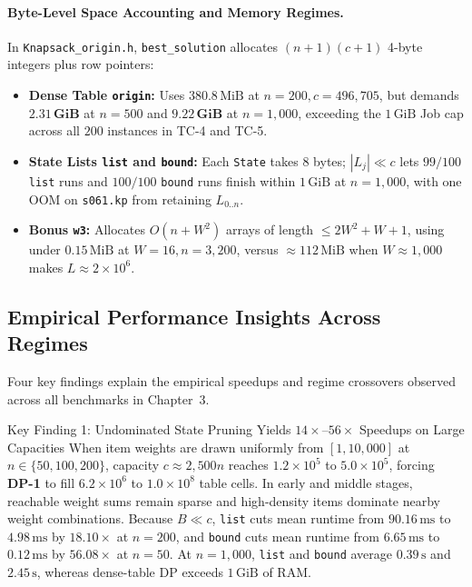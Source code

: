 \documentclass[10pt, a4paper]{article}
\newcommand{\code}[1]{\texttt{\color{primary!90!black}#1}}
\begin{document}
\paragraph{Byte-Level Space Accounting and Memory Regimes.}
In \code{Knapsack\_origin.h}, \code{best\_solution} allocates $(n+1)(c+1)$ 4-byte integers plus row pointers:
\begin{itemize}
  \item \textbf{Dense Table \code{origin}:} Uses $380.8\,\text{MiB}$ at $n = 200, c = 496{,}705$, but demands $\mathbf{2.31\,\text{GiB}}$ at $n = 500$ and $\mathbf{9.22\,\text{GiB}}$ at $n = 1{,}000$, exceeding the $1\,\text{GiB}$ Job cap across all $200$ instances in TC-4 and TC-5.
  \item \textbf{State Lists \code{list} and \code{bound}:} Each \code{State} takes $8$ bytes; $|L_j| \ll c$ lets $99/100$ \code{list} runs and $100/100$ \code{bound} runs finish within $1\,\text{GiB}$ at $n = 1{,}000$, with one OOM on \code{s061.kp} from retaining $L_{0..n}$.
  \item \textbf{Bonus \code{w3}:} Allocates $O(n + W^2)$ arrays of length $\le 2W^2 + W + 1$, using under $0.15\,\text{MiB}$ at $W = 16, n = 3{,}200$, versus $\approx 112\,\text{MiB}$ when $W \approx 1{,}000$ makes $L \approx 2\times 10^6$.
\end{itemize}

\subsection{Empirical Performance Insights Across Regimes}
Four key findings explain the empirical speedups and regime crossovers observed across all benchmarks in Chapter~3.

\vspace{-0.3em}
\begin{insightbox}{Key Finding 1: Undominated State Pruning Yields $14\times\text{--}56\times$ Speedups on Large Capacities}
When item weights are drawn uniformly from $[1, 10{,}000]$ at $n \in \{50, 100, 200\}$, capacity $c \approx 2{,}500n$ reaches $1.2 \times 10^5$ to $5.0 \times 10^5$, forcing \textbf{DP-1} to fill $6.2 \times 10^6$ to $1.0 \times 10^8$ table cells. In early and middle stages, reachable weight sums remain sparse and high-density items dominate nearby weight combinations. Because $B \ll c$, \code{list} cuts mean runtime from $90.16\,\text{ms}$ to $4.98\,\text{ms}$ by $\mathbf{18.10\times}$ at $n=200$, and \code{bound} cuts mean runtime from $6.65\,\text{ms}$ to $0.12\,\text{ms}$ by $\mathbf{56.08\times}$ at $n=50$. At $n=1{,}000$, \code{list} and \code{bound} average $0.39\,\text{s}$ and $2.45\,\text{s}$, whereas dense-table DP exceeds $1\,\text{GiB}$ of RAM.
\end{insightbox}
\vspace{-0.35em}
\end{document}
